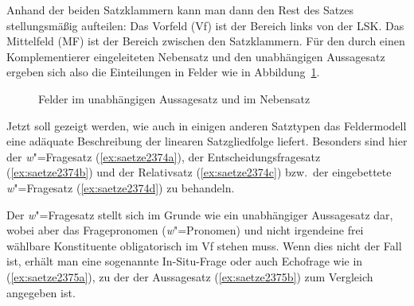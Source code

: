 Anhand der beiden Satzklammern kann man dann den Rest des Satzes stellungsmäßig aufteilen:
Das Vorfeld (Vf) ist der Bereich links von der LSK.
Das Mittelfeld (MF) ist der Bereich zwischen den Satzklammern.
Für den durch einen Komplementierer eingeleiteten Nebensatz und den unabhängigen Aussagesatz ergeben sich also die Einteilungen in Felder wie in Abbildung~\ref{fig:felder1}.

\begin{figure}
  \caption{Felder im unabhängigen Aussagesatz und im Nebensatz}
  \label{fig:felder1}
\end{figure}


Jetzt soll gezeigt werden, wie auch in einigen anderen Satztypen das Feldermodell eine adäquate Beschreibung der linearen Satzgliedfolge liefert.
Besonders sind hier der \textit{w}"=Fragesatz (\ref{ex:saetze2374a}), der Entscheidungsfragesatz (\ref{ex:saetze2374b}) und der Relativsatz (\ref{ex:saetze2374c}) bzw.\ der eingebettete \textit{w}"=Fragesatz (\ref{ex:saetze2374d}) zu behandeln.

\begin{exe}
  \ex\label{ex:saetze2374} 
  \begin{xlist}
  \end{xlist}
\end{exe}

\label{abs:923478} Der \textit{w}"=Fragesatz stellt sich im Grunde wie ein unabhängiger Aussagesatz dar, wobei aber das Fragepronomen (\textit{w}"=Pronomen) und nicht irgendeine frei wählbare Konstituente obligatorisch im Vf stehen muss.
Wenn dies nicht der Fall ist, erhält man eine sogenannte In-Situ-Frage oder auch Echofrage wie in (\ref{ex:saetze2375a}), zu der der Aussagesatz (\ref{ex:saetze2375b}) zum Vergleich angegeben ist.

